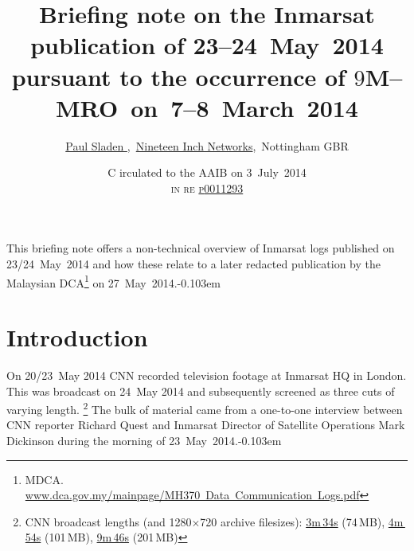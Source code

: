 \documentclass[tikz,a4paper,12pt]{article}
\begin{document}
\author{\href{http://www.paul.sladen.org/}{Paul Sladen%
},\, \href{http://www.19inch.net/}{Nineteen Inch Networks},\, Nottingham GBR
}
\title{%
Briefing note on the Inmarsat publication of 23--24~May~2014
pursuant to the occurrence of
$9$M--\EndAccSupp{}MRO~on~7--8~March~2014%
}
\date{
C%
irculated to the \acrlong{AAIB}
on
3~July~2014\\\textsc{in re} \href{https://www.whatdotheyknow.com/request/9m_mro75008f_aes_exchange_iq_sni}{\textsc{p\hspace{0.09em}}\EndAccSupp{}0011293}}
\maketitle
\vspace{-0.7em}

{This briefing note offers a non-technical overview of Inmarsat logs
published on 23/24~May~2014 and how these relate to a later
redacted publication by the Malaysian DCA\footnote{\acrlong{MDCA}.\,\href{http://www.dca.gov.my/mainpage/MH370\%20Data\%20Communication\%20Logs.pdf}{www.dca.gov.my/mainpage/MH370~Data~Communication~Logs.pdf}} on 27~May~2014.\unskip\parfillskip-0.103em \par}
\vspace{-1.5em}
\section{Introduction}
\vspace{-0.70em}
{On 20/23~May 2014 CNN recorded television footage at Inmarsat HQ in
London.  This was broadcast on 24~May 2014 and subsequently screened
as three cuts of varying length.%
\footnote{CNN broadcast lengths (and 1280$\times$720 archive filesizes):\hspace{0.4em}
\href{http://cnn-f.akamaihd.net/cnn/big/world/2014/05/27/intv-quest-inmarsat-data-dickinson.cnn_27014108_,512x288_55,640x360_90,768x432_130,896x504_185,1280x720_350,0k.mp4.csmil/bitrate=4}
{3m\,34s} (74\,\textsc{MB}),\hspace{0.4em}
\href{http://cnn-f.akamaihd.net/cnn/big/world/2014/05/27/pkg-quest-inmarsat-data.cnn_27020448_,512x288_55,640x360_90,768x432_130,896x504_185,1280x720_350,0k.mp4.csmil/bitrate=4}
{4m\,54s} (101\,\textsc{MB}),\hspace{0.4em}
\href{http://cnn-f.akamaihd.net/cnn/big/world/2014/05/27/intv-quest-uk-inmarsat-dickinson-long.cnn_27080346_,512x288_55,640x360_90,768x432_130,896x504_185,1280x720_350,0k.mp4.csmil/bitrate=4}
{9m\,46s} (201\,MB)}
The bulk of material came from a one-to-one interview between CNN
reporter Richard Quest and Inmarsat Director of Satellite Operations
Mark Dickinson during the morning of
23~May~2014.\unskip\parfillskip-0.103em \par}
\end{document}
